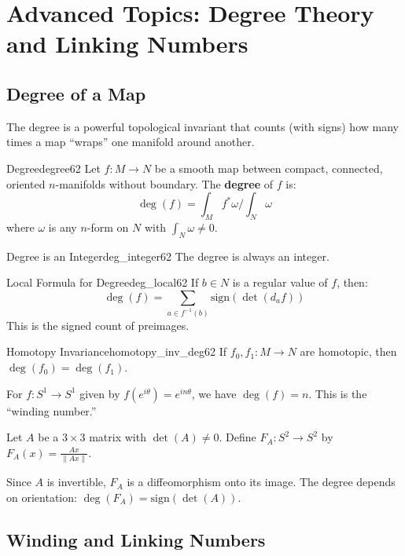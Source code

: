 \documentclass[11pt, letterpaper, openany]{book}
\begin{document}
\chapter{Advanced Topics: Degree Theory and Linking Numbers}

\section{Degree of a Map}

The degree is a powerful topological invariant that counts (with signs) how many times a map ``wraps'' one manifold around another.

\begin{defn}{Degree}{degree62}
Let $f: M \to N$ be a smooth map between compact, connected, oriented $n$-manifolds without boundary. The \textbf{degree} of $f$ is:
\[
\deg(f) = \int_M f^*\omega \bigg/ \int_N \omega
\]
where $\omega$ is any $n$-form on $N$ with $\int_N \omega \neq 0$.
\end{defn}

\begin{thm}{Degree is an Integer}{deg_integer62}
The degree is always an integer.
\end{thm}

\begin{thm}{Local Formula for Degree}{deg_local62}
If $b \in N$ is a regular value of $f$, then:
\[
\deg(f) = \sum_{a \in f^{-1}(b)} \text{sign}(\det(d_a f))
\]
This is the signed count of preimages.
\end{thm}

\begin{thm}{Homotopy Invariance}{homotopy_inv_deg62}
If $f_0, f_1: M \to N$ are homotopic, then $\deg(f_0) = \deg(f_1)$.
\end{thm}

\begin{example}
For $f: S^1 \to S^1$ given by $f(e^{i\theta}) = e^{in\theta}$, we have $\deg(f) = n$. This is the ``winding number.''
\end{example}

\begin{example}
Let $A$ be a $3 \times 3$ matrix with $\det(A) \neq 0$. Define $F_A: S^2 \to S^2$ by $F_A(x) = \frac{Ax}{\|Ax\|}$.

Since $A$ is invertible, $F_A$ is a diffeomorphism onto its image. The degree depends on orientation: $\deg(F_A) = \text{sign}(\det(A))$.
\end{example}

\section{Winding and Linking Numbers}
\end{document}
